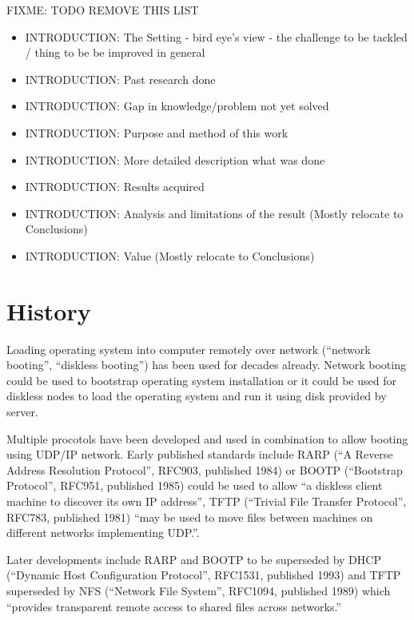 
FIXME: TODO REMOVE THIS LIST
\begin{itemize}
\item INTRODUCTION: The Setting - bird eye's view - the challenge to be tackled / thing to be be improved in general
\item INTRODUCTION: Past research done
\item INTRODUCTION: Gap in knowledge/problem not yet solved
\item INTRODUCTION: Purpose and method of this work
\item INTRODUCTION: More detailed description what was done
\item INTRODUCTION: Results acquired
\item INTRODUCTION: Analysis and limitations of the result (Mostly relocate to Conclusions)
\item INTRODUCTION: Value (Mostly relocate to Conclusions)
\end{itemize}


\section{History}

Loading operating system into computer remotely over network
(``network booting'', ``diskless booting'') has been used for decades
already. Network booting could be used to bootstrap operating system
installation or it could be used for diskless nodes to load the
operating system and run it using disk provided by server.

Multiple procotols have been developed and used in combination to
allow booting using UDP/IP network. Early published standards include
RARP (``A Reverse Address Resolution Protocol'', RFC903, published
1984\cite{RFC903}) or BOOTP (``Bootstrap Protocol'', RFC951, published
1985\cite{RFC951}) could be used to allow ``a diskless client machine
to discover its own IP address''\cite{RFC951}, TFTP (``Trivial File
Transfer Protocol'', RFC783, published 1981\cite{RFC783}) ``may be
used to move files between machines on different networks implementing
UDP.''\cite{RFC783}.

Later developments include RARP and BOOTP to be superseded by DHCP
(``Dynamic Host Configuration Protocol'', RFC1531, published
1993\cite{RFC1531}) and TFTP superseded by NFS (``Network File
System'', RFC1094, published 1989\cite{RFC1094}) which ``provides
transparent remote access to shared files across
networks.''\cite{RFC1094}


